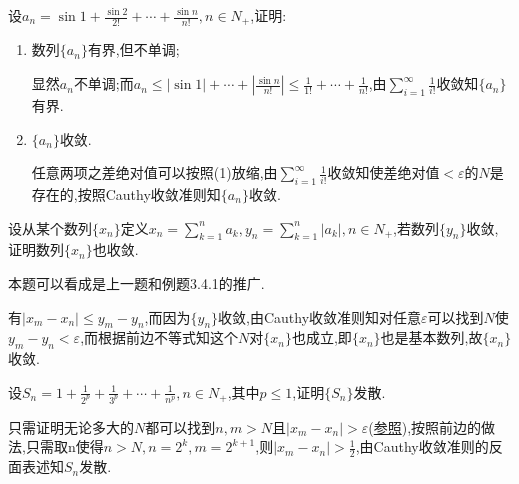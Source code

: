 \documentclass[cn,chinese]{elegantbook}
\begin{document}
            \begin{exercise}
                设$a_n=\sin1+\frac{\sin2}{2!}+\cdots+\frac{\sin n}{n!},n\in N_+$,证明:
                \begin{enumerate}
                    \item 数列$\{a_n\}$有界,但不单调;
                    \begin{solution}
                        显然$a_n$不单调;而$a_n\leqslant\left|\sin1\right|+\cdots+\left|\frac{\sin n}{n!}\right|\leqslant\frac{1}{1!}+\cdots+\frac{1}{n!}$,由$\sum_{i=1}^\infty\frac{1}{i!}$收敛知$\{a_n\}$有界.
                    \end{solution}
                    \item $\{a_n\}$收敛.
                    \begin{solution}
                        任意两项之差绝对值可以按照(1)放缩,由$\sum_{i=1}^\infty\frac{1}{i!}$收敛知使差绝对值$<\varepsilon$的$N$是存在的,按照Cauthy收敛准则知$\{a_n\}$收敛.
                    \end{solution}
                \end{enumerate}
            \end{exercise}

            \begin{exercise}
                设从某个数列$\{x_n\}$定义$x_n=\sum_{k=1}^na_k,y_n=\sum_{k=1}^n\left|a_k\right|,n\in N_+$,若数列$\{y_n\}$收敛,证明数列$\{x_n\}$也收敛.
                \begin{note}
                    本题可以看成是上一题和例题3.4.1的推广.
                \end{note}
            \end{exercise}
            \begin{solution}
                有$\left|x_m-x_n\right|\leqslant y_m-y_n$,而因为$\{y_n\}$收敛,由Cauthy收敛准则知对任意$\varepsilon$可以找到$N$使$y_m-y_n<\varepsilon$,而根据前边不等式知这个$N$对$\{x_n\}$也成立,即$\{x_n\}$也是基本数列,故$\{x_n\}$收敛.
            \end{solution}

            \begin{exercise}
                设$S_n=1+\frac{1}{2^p}+\frac{1}{3^p}+\cdots+\frac{1}{n^p},n\in N_+$,其中$p\leqslant 1$,证明$\{S_n\}$发散.
            \end{exercise}
            \begin{solution}
                只需证明无论多大的$N$都可以找到$n,m>N$且$\left|x_m-x_n\right|>\varepsilon$(\hyperlink{Cauthy}{参照}),按照前边的做法,只需取n使得$n>N,n=2^k,m=2^{k+1}$,则$\left|x_m-x_n\right|>\frac{1}{2}$,由Cauthy收敛准则的反面表述知$S_n$发散.
            \end{solution}
\end{document}
